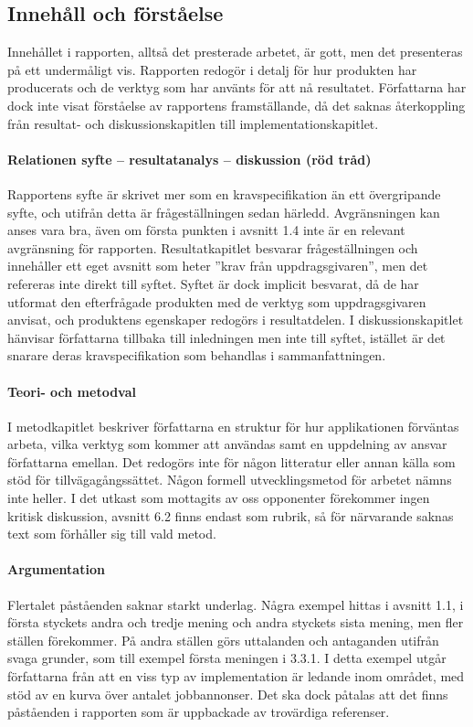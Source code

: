     \subsection{Innehåll och förståelse} %
    \label{sub:innehall}
    Innehållet i rapporten, alltså det presterade arbetet, är gott, men det presenteras på ett undermåligt vis. Rapporten redogör i detalj för hur produkten har producerats och de verktyg som har använts för att nå resultatet. Författarna har dock inte visat förståelse av rapportens framställande, då det saknas återkoppling från resultat- och diskussionskapitlen till implementationskapitlet.

    \paragraph{Relationen syfte – resultatanalys – diskussion (röd tråd)}
        Rapportens syfte är skrivet mer som en kravspecifikation än ett övergripande syfte, och utifrån detta är frågeställningen sedan härledd. Avgränsningen kan anses vara bra, även om första punkten i avsnitt 1.4 inte är en relevant avgränsning för rapporten. Resultatkapitlet besvarar frågeställningen och innehåller ett eget avsnitt som heter ''krav från uppdragsgivaren'', men det refereras inte direkt till syftet. Syftet är dock implicit besvarat, då de har utformat den efterfrågade produkten med de verktyg som uppdragsgivaren anvisat, och produktens egenskaper redogörs i resultatdelen. I diskussionskapitlet hänvisar författarna tillbaka till inledningen men inte till syftet, istället är det snarare deras kravspecifikation som behandlas i sammanfattningen.

    \paragraph{Teori- och metodval}
        I metodkapitlet beskriver författarna en struktur för hur applikationen förväntas arbeta, vilka verktyg som kommer att användas samt en uppdelning av ansvar författarna emellan. Det redogörs inte för någon litteratur eller annan källa som stöd för tillvägagångssättet. Någon formell utvecklingsmetod för arbetet nämns inte heller. I det utkast som mottagits av oss opponenter förekommer ingen kritisk diskussion, avsnitt 6.2 finns endast som rubrik, så för närvarande saknas text som förhåller sig till vald metod.

    \paragraph{Argumentation}
        Flertalet påståenden saknar starkt underlag. Några exempel hittas i avsnitt 1.1, i första styckets andra och tredje mening och andra styckets sista mening, men fler ställen förekommer. På andra ställen görs uttalanden och antaganden utifrån svaga grunder, som till exempel första meningen i 3.3.1. I detta exempel utgår författarna från att en viss typ av implementation är ledande inom området, med stöd av en kurva över antalet jobbannonser. Det ska dock påtalas att det finns påståenden i rapporten som är uppbackade av trovärdiga referenser.

